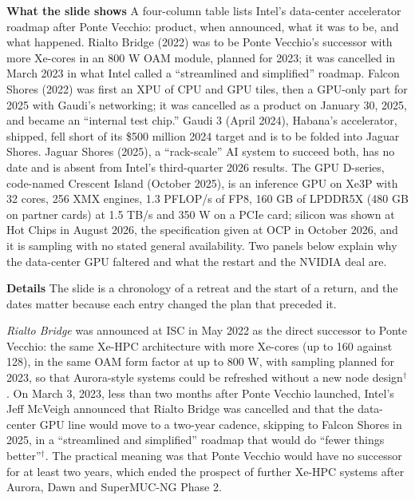\documentclass[11pt,letterpaper]{article}
\newcommand{\para}[1]{\medskip\noindent\textbf{#1}\quad}
\begin{document}
\para{What the slide shows} A four-column table lists Intel's data-center accelerator roadmap after Ponte Vecchio: product, when announced, what it was to be, and what happened. Rialto Bridge (2022) was to be Ponte Vecchio's successor with more Xe-cores in an 800 W OAM module, planned for 2023; it was cancelled in March 2023 in what Intel called a ``streamlined and simplified'' roadmap. Falcon Shores (2022) was first an XPU of CPU and GPU tiles, then a GPU-only part for 2025 with Gaudi's networking; it was cancelled as a product on January 30, 2025, and became an ``internal test chip.'' Gaudi 3 (April 2024), Habana's accelerator, shipped, fell short of its \$500 million 2024 target and is to be folded into Jaguar Shores. Jaguar Shores (2025), a ``rack-scale'' AI system to succeed both, has no date and is absent from Intel's third-quarter 2026 results. The GPU D-series, code-named Crescent Island (October 2025), is an inference GPU on Xe3P with 32 cores, 256 XMX engines, 1.3 PFLOP/s of FP8, 160 GB of LPDDR5X (480 GB on partner cards) at 1.5 TB/s and 350 W on a PCIe card; silicon was shown at Hot Chips in August 2026, the specification given at OCP in October 2026, and it is sampling with no stated general availability. Two panels below explain why the data-center GPU faltered and what the restart and the NVIDIA deal are.

\para{Details} The slide is a chronology of a retreat and the start of a return, and the dates matter because each entry changed the plan that preceded it.

\emph{Rialto Bridge} was announced at ISC in May 2022 as the direct successor to Ponte Vecchio: the same Xe-HPC architecture with more Xe-cores (up to 160 against 128), in the same OAM form factor at up to 800 W, with sampling planned for 2023, so that Aurora-style systems could be refreshed without a new node design$^\dagger$. On March 3, 2023, less than two months after Ponte Vecchio launched, Intel's Jeff McVeigh announced that Rialto Bridge was cancelled and that the data-center GPU line would move to a two-year cadence, skipping to Falcon Shores in 2025, in a ``streamlined and simplified'' roadmap that would do ``fewer things better''$^\dagger$. The practical meaning was that Ponte Vecchio would have no successor for at least two years, which ended the prospect of further Xe-HPC systems after Aurora, Dawn and SuperMUC-NG Phase 2.
\end{document}
